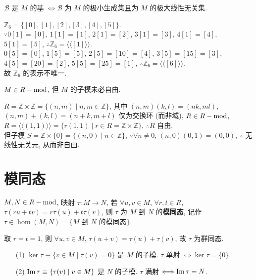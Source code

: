 \documentclass{note}
\begin{document}
\begin{thm}[(课本定理 4.4)]
     $\mathcal{B}$ 是 $M$ 的基 $\Longleftrightarrow\mathcal{B}$ 为 $M$ 的极小生成集\uline{且}为 $M$ 的极大线性无关集.
\end{thm}

\begin{eg}
    $\mathbb{Z}_6=\{[0],[1],[2],[3],[4],[5]\}$.\\
    $\because 0[1]=[0]$, $1[1]=[1]$, $2[1]=[2]$, $3[1]=[3]$, $4[1]=[4]$, $5[1]=[5]$, $\therefore\mathbb{Z}_6=\langle\langle[1]\rangle\rangle$.\\
    $0[5]=[0]$, $1[5]=[5]$, $2[5]=[10]=[4]$, $3[5]=[15]=[3]$, $4[5]=[20]=[2]$, $5[5]=[25]=[1]$, $\therefore\mathbb{Z}_6=\langle\langle[6]\rangle\rangle$.\\
    故 $\mathbb{Z}_6$ 的表示不唯一.
\end{eg}

$M\in R-\operatorname{mod}$, 但 $M$ 的子模未必自由.
\begin{eg}
    $R=\mathbb{Z}\times\mathbb{Z}=\{(n,m)\mid n,m\in\mathbb{Z}\}$, 其中 $(n,m)(k,l)=(nk,ml)$, $(n,m)+(k,l)=(n+k,m+l)$ 仅为交换环 (而非域), $R\in R-\operatorname{mod}$, $R=\langle\langle(1,1)\rangle\rangle=\{r(1,1)\mid r\in R=\mathbb{Z}\times\mathbb{Z}\}$, $\therefore R$ 自由.\\
    但子模 $S=\mathbb{Z}\times\{0\}=\{(n,0)\mid n\in\mathbb{Z}\}$, $\because\forall n\neq 0$, $(n,0)(0,1)=(0,0)$, $\therefore$ 无线性无关元, 从而非自由.
\end{eg}

\section{模同态}
\begin{df}[模同态]
    $M,N\in R-\operatorname{mod}$, 映射 $\tau:M\rightarrow N$, 若 $\forall u,v\in M$, $\forall r,t\in R$, $\tau(ru+tv)=r\tau(u)+t\tau(v)$, 则 $\tau$ 为 $M$ 到 $N$ 的\textbf{模同态}, 记作 $\tau\in\hom(M,N)=\{M$ 到 $N$ 的模同态$\}$.
\end{df}

取 $r=t=1$, 则 $\forall u,v\in M$, $\tau(u+v)=\tau(u)+\tau(v)$, 故 $\tau$ 为群同态.

\begin{thm}[(课本定理 4.6)]
    \begin{itemize}
        \item[(1)] $\ker\tau\equiv\{v\in M\mid\tau(v)=0\}$ 是 $M$ 的子模. $\tau$ 单射 $\Longleftrightarrow\ker\tau=\{0\}$.
        \item[(2)] $\operatorname{Im}\tau\equiv\{\tau(v)\mid v\in M\}$ 是 $N$ 的子模. $\tau$ 满射 $\Longleftrightarrow\operatorname{Im}\tau=N$.
    \end{itemize}
\end{thm}
\end{document}
